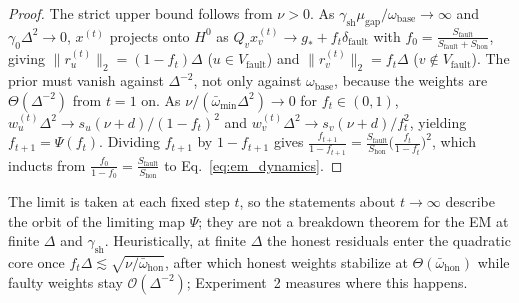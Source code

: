 \documentclass[11pt,a4paper]{article}
\theoremstyle{definition}
\theoremstyle{remark}
\begin{document}
\begin{proof}
The strict upper bound follows from $\nu > 0$. As $\gamma_{\mathrm{sh}}\mu_{\mathrm{gap}}/\omega_{\mathrm{base}} \to \infty$ and $\gamma_0\Delta^2 \to 0$, $x^{(t)}$ projects onto $H^0$ as $Q_v x_v^{(t)} \to g_* + f_t \delta_{\mathrm{fault}}$ with $f_0 = \frac{S_{\mathrm{fault}}}{S_{\mathrm{fault}} + S_{\mathrm{hon}}}$, giving $\|r_u^{(t)}\|_2 = (1 - f_t)\Delta$ ($u \in V_{\mathrm{fault}}$) and $\|r_v^{(t)}\|_2 = f_t \Delta$ ($v \notin V_{\mathrm{fault}}$). The prior must vanish against $\Delta^{-2}$, not only against $\omega_{\mathrm{base}}$, because the weights are $\Theta(\Delta^{-2})$ from $t = 1$ on. As $\nu/(\bar{\omega}_{\min}\Delta^2) \to 0$ for $f_t \in (0, 1)$, $w_u^{(t)} \Delta^2 \to s_u(\nu+d)/(1-f_t)^2$ and $w_v^{(t)} \Delta^2 \to s_v(\nu+d)/f_t^2$, yielding $f_{t+1} = \Psi(f_t)$. Dividing $f_{t+1}$ by $1 - f_{t+1}$ gives $\frac{f_{t+1}}{1 - f_{t+1}} = \frac{S_{\mathrm{fault}}}{S_{\mathrm{hon}}}\bigl(\frac{f_t}{1 - f_t}\bigr)^2$, which inducts from $\frac{f_0}{1 - f_0} = \frac{S_{\mathrm{fault}}}{S_{\mathrm{hon}}}$ to Eq.~\eqref{eq:em_dynamics}.
\end{proof}

The limit is taken at each fixed step $t$, so the statements about $t \to \infty$ describe the orbit of the limiting map $\Psi$; they are not a breakdown theorem for the EM at finite $\Delta$ and $\gamma_{\mathrm{sh}}$. Heuristically, at finite $\Delta$ the honest residuals enter the quadratic core once $f_t \Delta \lesssim \sqrt{\nu/\bar{\omega}_{\mathrm{hon}}}$, after which honest weights stabilize at $\Theta(\bar{\omega}_{\mathrm{hon}})$ while faulty weights stay $\mathcal{O}(\Delta^{-2})$; Experiment~2 measures where this happens.
\end{document}

